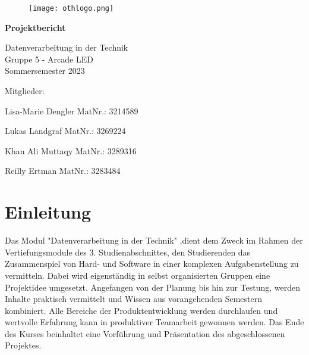 \documentclass[12pt,a4paper]{article}
\begin{document}
\setlength{\parindent}{0em} 

	\begin{titlepage}
		\begin{center}
			\begin{figure}[h]
			\texttt{[image: othlogo.png]}
			\end{figure}
 	  	\vspace{1cm}
      	\textbf{\Huge{Projektbericht}}
      	
      	\vspace{0.5cm}
      	\huge{Datenverarbeitung in der Technik}\\
      	\vspace{0.5cm}
      	\huge{Gruppe 5 - Arcade LED}\\
      	\vspace{0.5cm}
      	\huge{Sommersemester 2023}
      	\vspace{10cm}
      	\end{center}
      	
      \large{Mitglieder: }
   
      \large{Lisa-Marie Dengler MatNr.: 3214589}
      
      \large{Lukas Landgraf MatNr.: 3269224}
      
      \large{Khan Ali Muttaqy MatNr.: 3289316}
      
      \large{Reilly Ertman MatNr.: 3283484}	
	\end{titlepage}

\thispagestyle{empty}
\newpage

\tableofcontents
\setcounter{page}{1}
\pagebreak



\section{Einleitung}
Das Modul "Datenverarbeitung in der Technik" ,dient dem Zweck im Rahmen der Vertiefungsmodule des 3. Studienabschnittes, den Studierenden das Zusammenspiel von Hard- und Software in einer komplexen Aufgabenstellung zu vermitteln. Dabei wird eigenständig in selbst organisierten Gruppen eine Projektidee umgesetzt. Angefangen von der Planung bis hin zur Testung, werden Inhalte praktisch vermittelt und Wissen aus vorangehenden Semestern kombiniert. Alle Bereiche der Produktentwicklung werden durchlaufen und wertvolle Erfahrung kann in produktiver Teamarbeit gewonnen werden. Das Ende des Kurses beinhaltet eine Vorführung und Präsentation des abgeschlossenen Projektes.
\end{document}
